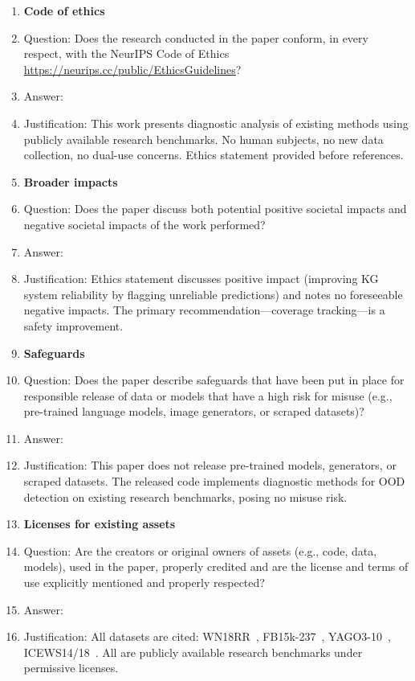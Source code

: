 \begin{enumerate}
\item {\bf Code of ethics}
    \item[] Question: Does the research conducted in the paper conform, in every respect, with the NeurIPS Code of Ethics \url{https://neurips.cc/public/EthicsGuidelines}?
    \item[] Answer: \answerYes{}
    \item[] Justification: This work presents diagnostic analysis of existing methods using publicly available research benchmarks. No human subjects, no new data collection, no dual-use concerns. Ethics statement provided before references.


\item {\bf Broader impacts}
    \item[] Question: Does the paper discuss both potential positive societal impacts and negative societal impacts of the work performed?
    \item[] Answer: \answerYes{}
    \item[] Justification: Ethics statement discusses positive impact (improving KG system reliability by flagging unreliable predictions) and notes no foreseeable negative impacts. The primary recommendation---coverage tracking---is a safety improvement.

\item {\bf Safeguards}
    \item[] Question: Does the paper describe safeguards that have been put in place for responsible release of data or models that have a high risk for misuse (e.g., pre-trained language models, image generators, or scraped datasets)?
    \item[] Answer: \answerNA{}
    \item[] Justification: This paper does not release pre-trained models, generators, or scraped datasets. The released code implements diagnostic methods for OOD detection on existing research benchmarks, posing no misuse risk.

\item {\bf Licenses for existing assets}
    \item[] Question: Are the creators or original owners of assets (e.g., code, data, models), used in the paper, properly credited and are the license and terms of use explicitly mentioned and properly respected?
    \item[] Answer: \answerYes{}
    \item[] Justification: All datasets are cited: WN18RR~\citep{dettmers2018convolutional}, FB15k-237~\citep{toutanova2015observed}, YAGO3-10~\citep{mahdisoltani2015yago3}, ICEWS14/18~\citep{garcia2018learning}. All are publicly available research benchmarks under permissive licenses.


\end{enumerate}
